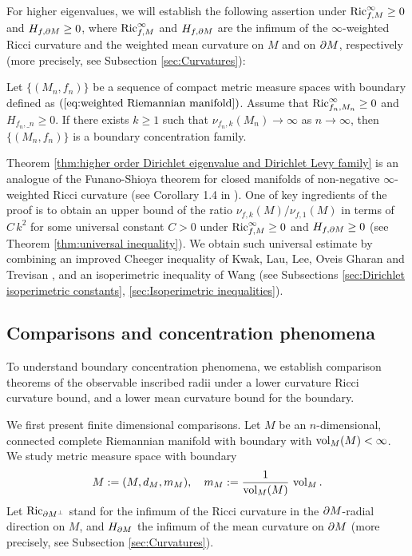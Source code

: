 For higher eigenvalues,
we will establish the following assertion under $\operatorname{Ric}^{\infty}_{f,M}\geq 0$ and $H_{f,\partial M}\geq 0$,
where $\operatorname{Ric}^{\infty}_{f,M}$ and $H_{f,\partial M}$ are the infimum of the $\infty$-weighted Ricci curvature and the weighted mean curvature on $M$ and on $\partial M$,
respectively (more precisely, see Subsection \ref{sec:Curvatures}):
\begin{thm}\label{thm:higher order Dirichlet eigenvalue and Dirichlet Levy family}
Let $\{(M_{n},f_{n})\}$ be a sequence of compact metric measure spaces with boundary defined as $(\ref{eq:weighted Riemannian manifold})$.
Assume that
$\operatorname{Ric}^{\infty}_{f_{n},M_{n}}\geq 0$ and $H_{f_{n},\bm_{n}}\geq 0$.
If there exists $k\geq 1$ such that $\nu_{f_{n},k}(M_{n})\to \infty$ as $n\to \infty$,
then $\{(M_{n},f_{n})\}$ is a boundary concentration family.
\end{thm}

Theorem \ref{thm:higher order Dirichlet eigenvalue and Dirichlet Levy family} is an analogue of the Funano-Shioya theorem for closed manifolds of non-negative $\infty$-weighted Ricci curvature (see Corollary 1.4 in \cite{FSh}).
One of key ingredients of the proof is to obtain an upper bound of the ratio $\nu_{f,k}(M)/\nu_{f,1}(M)$ in terms of $C\,k^{2}$ for some universal constant $C>0$ under $\operatorname{Ric}^{\infty}_{f,M}\geq 0$ and $H_{f,\partial M}\geq 0$ (see Theorem \ref{thm:universal inequality}).
We obtain such universal estimate by combining an improved Cheeger inequality of Kwak, Lau, Lee, Oveis Gharan and Trevisan \cite{KLLOT},
and an isoperimetric inequality of Wang \cite{Wa} (see Subsections \ref{sec:Dirichlet isoperimetric constants}, \ref{sec:Isoperimetric inequalities}).

\subsection{Comparisons and concentration phenomena}\label{sec:Comparisons and concentration phenomena}
To understand boundary concentration phenomena,
we establish comparison theorems of the observable inscribed radii under a lower curvature Ricci curvature bound,
and a lower mean curvature bound for the boundary.

We first present finite dimensional comparisons.
Let $M$ be an $n$-dimensional,
connected complete Riemannian manifold with boundary with $\operatorname{vol}_{M}(M)<\infty$.
We study metric measure space with boundary
\begin{equation}\label{eq:normalized metric measure space with boundary}
M:=(M,d_{M},m_{M}),\quad m_{M}:=\frac{1}{\operatorname{vol}_{M} (M)} \,\operatorname{vol}_{M}.
\end{equation}
Let $\operatorname{Ric}_{\partial M^{\perp}}$ stand for the infimum of the Ricci curvature in the $\partial M$-radial direction on $M$,
and $H_{\partial M}$ the infimum of the mean curvature on $\partial M$ (more precisely, see Subsection \ref{sec:Curvatures}).

